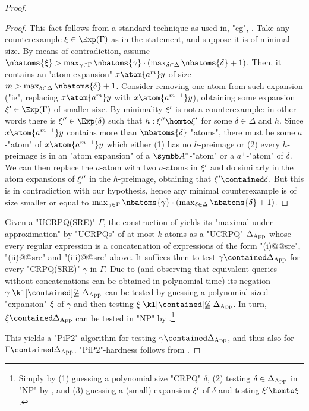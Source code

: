 \begin{proof}
	\begin{proof}
		This fact follows from a standard technique as used in, "eg", \cite{FigueiraEtal2020Containment}.
		Take any counterexample $\anexpansion \in \Exp(\Gamma)$ as in the statement, and suppose it is of minimal size. By means of contradiction, assume $\nbatoms{\anexpansion} > \max_{\gamma \in \Gamma}\nbatoms{\gamma} \cdot (\max_{\delta \in \Delta}\nbatoms{\delta}+1)$. 
		Then, it contains an "atom expansion" $x \atom{a^m} y$ of size $m>\max_{\delta \in \Delta}\nbatoms{\delta}+1$. 
		Consider removing one atom from such expansion ("ie", replacing $x \atom{a^m} y$ with $x \atom{a^{m-1}} y$), obtaining some expansion $\anexpansion' \in \Exp(\Gamma)$ of smaller size. By minimality $\xi'$ is not a counterexample: in other words there is  $\anexpansion'' \in \Exp(\delta)$ such that $h:\anexpansion'' \homto \anexpansion'$ for some $\delta \in \Delta$ and $h$. Since $x \atom{a^{m-1}} y$ contains more than $\nbatoms{\delta}$ "atoms", there must be some $a$-"atom" of $x \atom{a^{m-1}} y$ which either (1) has no $h$-preimage or (2) every $h$-preimage is in an "atom expansion" of a $\A^*$-"atom" or a $a^+$-"atom" of $\delta$. We can then replace the $a$-atom with two $a$-atoms in $\xi'$ and do similarly in the atom expansions of $\xi''$ in the $h$-preimage, obtaining that $\anexpansion' \contained \delta$. But this is in contradiction with our hypothesis, hence any minimal counterexample is of size smaller or equal to $\max_{\gamma \in \Gamma}\nbatoms{\gamma} \cdot (\max_{\delta \in \Delta}\nbatoms{\delta}+1)$.
	\end{proof}
	
	Given a "UCRPQ(SRE)" $\Gamma$, the construction of  yields its "maximal under-approximation" by "UCRPQs" of at most $k$ atoms as a "UCRPQ" $\Delta_{\textnormal{App}}$ whose every regular expression is a concatenation of expressions of the form "(i)@@sre", "(ii)@@sre" and "(iii)@@sre" above.
	It suffices then to test $\gamma \contained \Delta_{\textnormal{App}}$ for every "CRPQ(SRE)" $\gamma$ in $\Gamma$. Due to 
	(and observing that equivalent queries without concatenations can be obtained in polynomial time)
	its negation $\gamma \notcontained \Delta_{\textnormal{App}}$ can be tested by guessing a polynomial sized "expansion" $\xi$ of $\gamma$ and then testing $\anexpansion \notcontained \Delta_{\textnormal{App}}$.
	In turn, $\anexpansion \contained \Delta_{\textnormal{App}}$ can be tested in "NP" by 
	\cite[Theorem 4.2]{FigueiraEtal2020Containment}.\footnote{Simply by (1) guessing a polynomial size "CRPQ" $\delta$, (2) testing $\delta \in \Delta_{\textnormal{App}}$ in "NP" by , and (3) guessing a (small) expansion $\xi'$ of $\delta$ and testing $\anexpansion' \homto \anexpansion$.}

	This yields a "PiP2" algorithm for testing $\gamma \contained \Delta_{\textnormal{App}}$, and thus also for $\Gamma \contained \Delta_{\textnormal{App}}$.
	"PiP2"-hardness follows from .
\end{proof}

